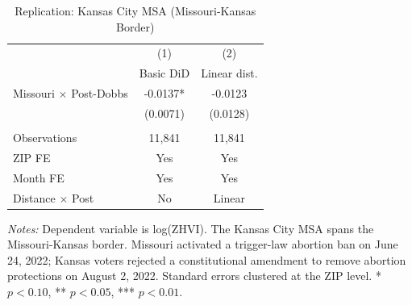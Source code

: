 \begin{table}[H]
\centering
\caption{Replication: Kansas City MSA (Missouri-Kansas Border)}
\label{tab:kc}
\begin{threeparttable}
\begin{tabular}{lcc}
\toprule
& (1) & (2) \\
& Basic DiD & Linear dist. \\
\midrule
Missouri $\times$ Post-Dobbs & -0.0137* & -0.0123 \\
& (0.0071) & (0.0128) \\
\\
Observations & 11,841 & 11,841 \\
ZIP FE & Yes & Yes \\
Month FE & Yes & Yes \\
Distance $\times$ Post & No & Linear \\
\bottomrule
\end{tabular}
\begin{tablenotes}[flushleft]
\small
\item \textit{Notes:} Dependent variable is log(ZHVI). The Kansas City MSA spans the Missouri-Kansas border. Missouri activated a trigger-law abortion ban on June 24, 2022; Kansas voters rejected a constitutional amendment to remove abortion protections on August 2, 2022. Standard errors clustered at the ZIP level. * $p<0.10$, ** $p<0.05$, *** $p<0.01$.
\end{tablenotes}
\end{threeparttable}
\end{table}
